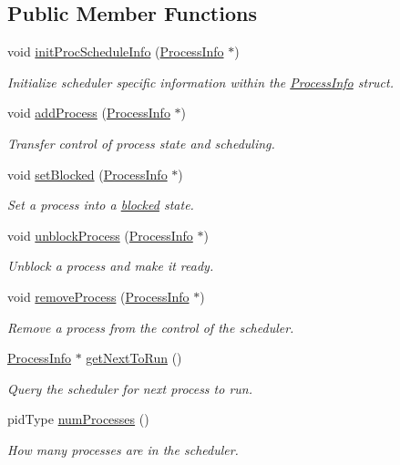 \subsection*{\-Public \-Member \-Functions}
\begin{DoxyCompactItemize}
\item 
void \hyperlink{classcFCFS_aff34f18c6f4c3f38029d904cd2ec55de}{init\-Proc\-Schedule\-Info} (\hyperlink{structProcessInfo}{\-Process\-Info} $\ast$)
\begin{DoxyCompactList}\small\item\em \-Initialize scheduler specific information within the \hyperlink{structProcessInfo}{\-Process\-Info} struct. \end{DoxyCompactList}\item 
void \hyperlink{classcFCFS_a25d4bf440041f5294f3b9c5aff20b411}{add\-Process} (\hyperlink{structProcessInfo}{\-Process\-Info} $\ast$)
\begin{DoxyCompactList}\small\item\em \-Transfer control of process state and scheduling. \end{DoxyCompactList}\item 
void \hyperlink{classcFCFS_a1b8ee3a759a31032ec7c1cd7b15ed5df}{set\-Blocked} (\hyperlink{structProcessInfo}{\-Process\-Info} $\ast$)
\begin{DoxyCompactList}\small\item\em \-Set a process into a \hyperlink{process_8h_a2c72cb00af5be695c1f898162350821fa035732e2026cb263f1bd9eee6ca6ae01}{blocked} state. \end{DoxyCompactList}\item 
void \hyperlink{classcFCFS_a793da0298f9b36ab8505a0e3daaf41ec}{unblock\-Process} (\hyperlink{structProcessInfo}{\-Process\-Info} $\ast$)
\begin{DoxyCompactList}\small\item\em \-Unblock a process and make it ready. \end{DoxyCompactList}\item 
void \hyperlink{classcFCFS_aeeac757885108ae510b728600ebba248}{remove\-Process} (\hyperlink{structProcessInfo}{\-Process\-Info} $\ast$)
\begin{DoxyCompactList}\small\item\em \-Remove a process from the control of the scheduler. \end{DoxyCompactList}\item 
\hyperlink{structProcessInfo}{\-Process\-Info} $\ast$ \hyperlink{classcFCFS_aa2b92a8a992078e499aab455c9d78faf}{get\-Next\-To\-Run} ()
\begin{DoxyCompactList}\small\item\em \-Query the scheduler for next process to run. \end{DoxyCompactList}\item 
pid\-Type \hyperlink{classcFCFS_a0a72de791436a84120a534dd2fa0485d}{num\-Processes} ()
\begin{DoxyCompactList}\small\item\em \-How many processes are in the scheduler. \end{DoxyCompactList}\end{DoxyCompactItemize}
